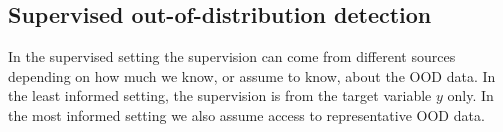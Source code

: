 \subsection{Supervised out-of-distribution detection}
%
%
In the supervised setting the supervision can come from different sources depending on how much we know, or assume to know, about the OOD data. In the least informed setting, the supervision is from the target variable $y$ only. In the most informed setting we also assume access to representative OOD data. 

